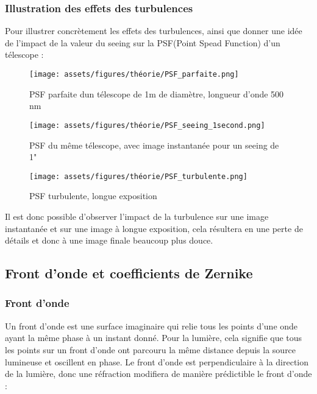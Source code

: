 
\newpage
\subsubsection{Illustration des effets des turbulences}

Pour illustrer concrètement les effets des turbulences, ainsi que donner une idée de l'impact de la valeur du seeing sur la PSF\footnotemark (Point Spead Function) d'un télescope
:
\begin{figure}[H]
  \centering
  \texttt{[image: assets/figures/théorie/PSF\_parfaite.png]}
  \caption[PSF parfaite]{PSF parfaite d\textquotesingle un télescope de 1m de diamètre, longueur d'onde 500 nm}
\end{figure}

\begin{figure}[H]
  \centering
  \texttt{[image: assets/figures/théorie/PSF\_seeing\_1second.png]}
  \caption[PSF avec seeing 1"]{PSF du même télescope, avec image instantanée pour un seeing de 1"}
\end{figure}
\begin{figure}[H]
  \centering
  \texttt{[image: assets/figures/théorie/PSF\_turbulente.png]}
  \caption[PSF turbulente]{PSF turbulente, longue exposition}
\end{figure}

Il est donc possible d'observer l'impact de la turbulence sur une image instantanée et sur une image à longue exposition, cela résultera en une perte de détails et donc à une image
finale beaucoup plus douce.


\subsection{Front d'onde et coefficients de Zernike}
\subsubsection{Front d'onde}
Un front d'onde est une surface imaginaire qui relie tous les points d'une onde ayant la même phase à un instant donné.
Pour la lumière, cela signifie que tous les points sur un front d'onde ont parcouru la même distance depuis la source lumineuse et oscillent en phase.
Le front d'onde est perpendiculaire à la direction de la lumière, donc une réfraction modifiera de manière prédictible le front d'onde :

